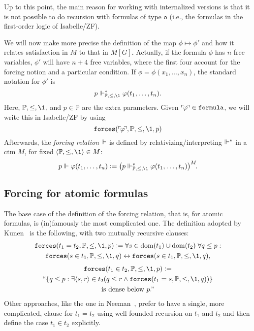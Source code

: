 \documentclass[11pt,english]{article}
\renewcommand{\PP}{\mathbb{P}}
\newcommand{\formula}{\ensuremath{\mathtt{formula}}}
\newcommand{\tyo}{\mathtt{o}}
\newcommand{\forceisa}{\mathtt{forces}}
\begin{document}
Up to this point, the main reason for working with internalized
versions is that  it is not possible to do recursion with formulas of
type $\tyo$ (i.e., the formulas in the first-order logic of
Isabelle/ZF).

We will now make more precise the definition of the map
$\phi\mapsto\phi'$ and how it relates satisfaction in $M$ to that in
$M[G]$. Actually, if the formula $\phi$ has $n$ free variables,
$\phi'$ will have $n+4$ free variables, where the first four account
for the forcing notion and a particular condition. If
$\phi=\phi(x_1,\dots,x_n)$, the standard notation for $\phi'$ is
\[
p\forces_{\PP,\leq,\1}^* \phi(t_1,\dots,t_n).
\]
Here, $\PP,\leq,\1,$ and $p\in\PP$ are the extra parameters. 
Given $\quine\phi\in\formula$, we will write this  in
Isabelle/ZF by using  
\[
\forceisa(\quine\phi,\PP,\leq,\1,p)
\]
Afterwards, the \emph{forcing relation} $\Vdash$ is defined by
relativizing/interpreting $\Vdash^*$ in a ctm $M$, for fixed
$\lb\PP,\leq,\1\rb\in M$:
\[
p\forces \phi(t_1,\dots,t_n) \defi 
\bigl(p\forces_{\PP,\leq,\1}^* \phi(t_1,\dots,t_n)\bigr)^M\!.
\]

\subsection{Forcing for atomic formulas}\label{sec:forcing-atomic-formulas}
The base case of the definition of the forcing relation, that is, for
atomic formulas, is (in)famously the most complicated one. 
The definition adopted by Kunen~\cite[p.~257]{kunen2011set} is the
following, with two mutually recursive clauses:
\begin{multline}\label{eq:def-forcing-equality}
  \forceisa({t_1= t_2},\PP,\leq,\1,p) \defi 
  \forall s\in\dom(t_1)\cup\dom(t_2)\;\forall q\leq p :\\
  \forceisa({s\in t_1},\PP,\leq,\1,q)\lsii 
  \forceisa({s\in t_1},\PP,\leq,\1,q),
\end{multline}
\begin{multline}\label{eq:def-forcing-membership}
  \forceisa({t_1\in t_2},\PP,\leq,\1,p) \defi  \\
  \text{``}\{q\leq p : \exists \lb s,r\rb\in t_2 (q\leq r \y
  \forceisa({t_1 =s},\PP,\leq,\1,q))\} \\
  \text{is dense below $p$.''}
\end{multline}
Other approaches, like the one in Neeman~\cite{neeman-course}, prefer
to have a single, more complicated, clause for $t_1=t_2$ using
well-founded recursion on $t_1$
and $t_2$ and then define the case $t_1\in t_2$ explicitly. 
\end{document}

